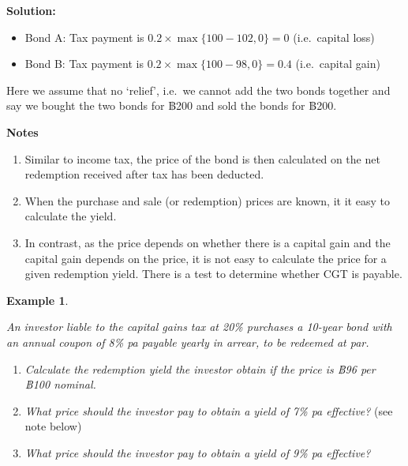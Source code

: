 \documentclass[landscape, 20pt]{extreport}
\theoremstyle{definition}
\theoremstyle{definition}
\newtheorem{example}{Example}[chapter]
\theoremstyle{definition}
\theoremstyle{definition}
\theoremstyle{remark}
\begin{document}
\textbf{Solution:}

\begin{itemize}
\item
  Bond A: Tax payment is \(0.2 \times \max\{100 - 102,0 \} = 0\) (i.e.~capital loss)
\item
  Bond B: Tax payment is \(0.2 \times \max\{100 - 98,0 \} = 0.4\) (i.e.~capital gain)
\end{itemize}

Here we assume that no `relief', i.e.~we cannot add the two bonds together and say we bought the two bonds for ฿200 and sold the bonds for ฿200.

\textbf{Notes}

\begin{enumerate}
\def\labelenumi{\arabic{enumi}.}
\item
  Similar to income tax, the price of the bond is then calculated on
  the net redemption received after tax has been deducted.
\item
  When the purchase and sale (or redemption) prices are known, it it
  easy to calculate the yield.
\item
  In contrast, as the price depends on whether there is a capital gain
  and the capital gain depends on the price, it is not easy to
  calculate the price for a given redemption yield. There is a test to
  determine whether CGT is payable.
\end{enumerate}

\newpage \begin{example}
\protect\hypertarget{exm:unlabeled-div-51}{}\label{exm:unlabeled-div-51}

\emph{An investor liable to the capital gains tax at 20\%
purchases a 10-year bond with an annual coupon of 8\% pa payable yearly
in arrear, to be redeemed at par.}

\begin{enumerate}
\def\labelenumi{\arabic{enumi}.}
\item
  \emph{Calculate the redemption yield the investor obtain if the price is
  ฿96 per ฿100 nominal.}
\item
  \emph{What price should the investor pay to obtain a yield of 7\% pa
  effective?} (see note below)
\item
  \emph{What price should the investor pay to obtain a yield of 9\% pa effective?}\\
\end{enumerate}

\end{example}
\end{document}
